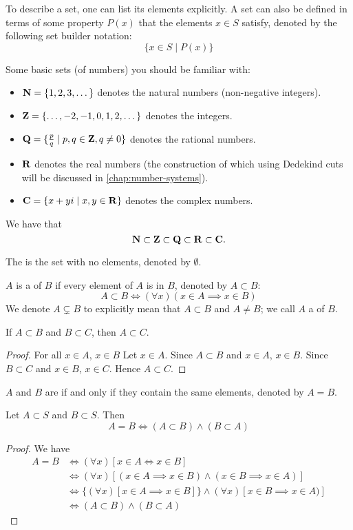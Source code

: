 To describe a set, one can list its elements explicitly. A set can also be defined in terms of some property $P(x)$ that the elements $x \in S$ satisfy, denoted by the following set builder notation:
\[\{x\in S \mid P(x)\}\]

Some basic sets (of numbers) you should be familiar with:
\begin{itemize}
\item $\mathbf N=\{1,2,3,\dots\}$ denotes the natural numbers (non-negative integers).
\item $\mathbf Z=\{\dots,-2,-1,0,1,2,\dots\}$ denotes the integers.
\item $\mathbf Q=\{\frac{p}{q} \mid p,q\in\mathbf Z, q\neq0\}$ denotes the rational numbers.
\item $\mathbf R$ denotes the real numbers (the construction of which using Dedekind cuts will be discussed in \cref{chap:number-systems}).
\item $\mathbf C=\{x+yi \mid x,y\in\mathbf R\}$ denotes the complex numbers.
\end{itemize}

We have that
\[\mathbf N\subset\mathbf Z\subset\mathbf Q\subset\mathbf R\subset\mathbf C.\]

The  is the set with no elements, denoted by $\emptyset$.

$A$ is a  of $B$ if every element of $A$ is in $B$, denoted by $A\subset B$:
\[A\subset B\iff(\forall x)(x\in A \implies x\in B)\]
We denote $A\subsetneq B$ to explicitly mean that $A\subset B$ and $A\neq B$; we call $A$ a  of $B$.

\begin{proposition}
If $A \subset B$ and $B \subset C$, then $A \subset C$.
\end{proposition}

\begin{proof}
For all $x\in A$, $x\in B$
Let $x\in A$. 
Since $A \subset B$ and $x\in A$, $x\in B$. 
Since $B \subset C$ and $x\in B$, $x\in C$. 
Hence $A \subset C$.
\end{proof}

$A$ and $B$ are  if and only if they contain the same elements, denoted by $A=B$. 

\begin{proposition}
Let $A\subset S$ and $B\subset S$. Then
\[A=B\iff (A\subset B)\land(B\subset A)\]
\end{proposition}

\begin{proof}
We have 
\begin{align*}
A = B &\iff (\forall x)[x \in A \iff x \in B] \\
&\iff (\forall x)[(x \in A \implies x \in B) \land (x \in B \implies x \in A)] \\
&\iff \{(\forall x)[x \in A \implies x \in B]\} \land {(\forall x)[x \in B \implies x \in A)]} \\
&\iff (A \subset B) \land (B \subset A)
\end{align*}
\end{proof}

